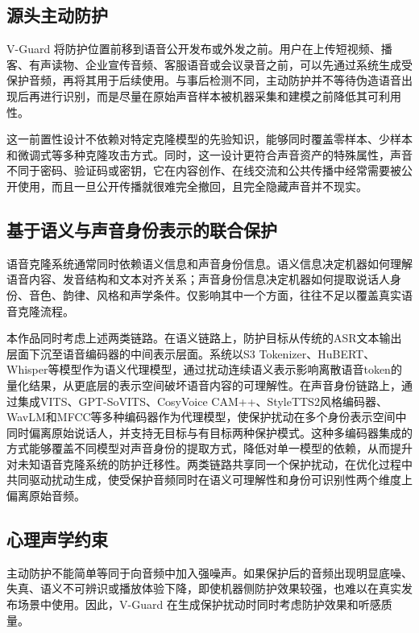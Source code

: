 \subsection{源头主动防护}\label{ux6e90ux5934ux4e3bux52a8ux9632ux62a4}

V-Guard
将防护位置前移到语音公开发布或外发之前。用户在上传短视频、播客、有声读物、企业宣传音频、客服语音或会议录音之前，可以先通过系统生成受保护音频，再将其用于后续使用。与事后检测不同，主动防护并不等待伪造语音出现后再进行识别，而是尽量在原始声音样本被机器采集和建模之前降低其可利用性。

这一前置性设计不依赖对特定克隆模型的先验知识，能够同时覆盖零样本、少样本和微调式等多种克隆攻击方式。同时，这一设计更符合声音资产的特殊属性，声音不同于密码、验证码或密钥，它在内容创作、在线交流和公共传播中经常需要被公开使用，而且一旦公开传播就很难完全撤回，且完全隐藏声音并不现实。

\subsection{基于语义与声音身份表示的联合保护}\label{ux57faux4e8eux8bedux4e49ux4e0eux58f0ux97f3ux8eabux4efdux8868ux793aux7684ux8054ux5408ux4fddux62a4}

语音克隆系统通常同时依赖语义信息和声音身份信息。语义信息决定机器如何理解语音内容、发音结构和文本对齐关系；声音身份信息决定机器如何提取说话人身份、音色、韵律、风格和声学条件。仅影响其中一个方面，往往不足以覆盖真实语音克隆流程。

本作品同时考虑上述两类链路。在语义链路上，防护目标从传统的ASR文本输出层面下沉至语音编码器的中间表示层面。系统以S3
Tokenizer、HuBERT、Whisper等模型作为语义代理模型，通过扰动连续语义表示影响离散语音token的量化结果，从更底层的表示空间破坏语音内容的可理解性。在声音身份链路上，通过集成VITS、GPT-SoVITS、CosyVoice
CAM++、StyleTTS2风格编码器、WavLM和MFCC等多种编码器作为代理模型，使保护扰动在多个身份表示空间中同时偏离原始说话人，并支持无目标与有目标两种保护模式。这种多编码器集成的方式能够覆盖不同模型对声音身份的提取方式，降低对单一模型的依赖，从而提升对未知语音克隆系统的防护迁移性。两类链路共享同一个保护扰动，在优化过程中共同驱动扰动生成，使受保护音频同时在语义可理解性和身份可识别性两个维度上偏离原始音频。

\subsection{心理声学约束}\label{ux5fc3ux7406ux58f0ux5b66ux7ea6ux675f}

主动防护不能简单等同于向音频中加入强噪声。如果保护后的音频出现明显底噪、失真、语义不可辨识或播放体验下降，即使机器侧防护效果较强，也难以在真实发布场景中使用。因此，V-Guard
在生成保护扰动时同时考虑防护效果和听感质量。

